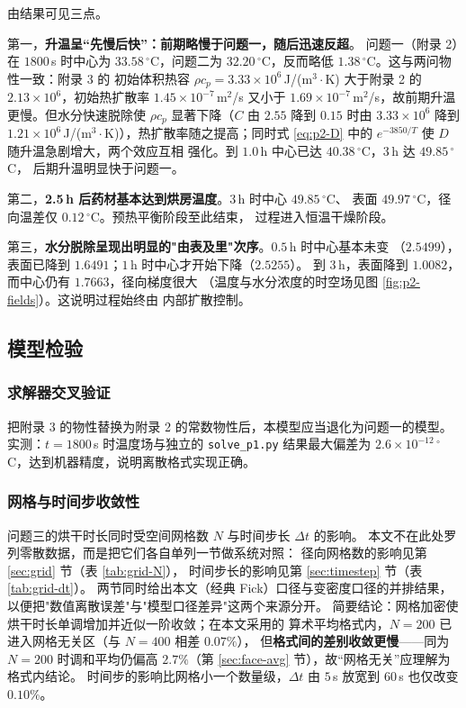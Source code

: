 \documentclass[12pt,a4paper,fontset=none]{ctexart}
\begin{document}
由结果可见三点。

第一，\textbf{升温呈“先慢后快”：前期略慢于问题一，随后迅速反超}。
问题一（附录 2）在 $1800$\,s 时中心为 $33.58\,^\circ$C，问题二为
$32.20\,^\circ$C，反而略低 $1.38\,^\circ$C。这与两问物性一致：附录 3 的
初始体积热容 $\rho c_p=3.33\times10^6$\,J/(m$^3\cdot$K) 大于附录 2 的
$2.13\times10^6$，初始热扩散率 $1.45\times10^{-7}$\,m$^2$/s 又小于
$1.69\times10^{-7}$\,m$^2$/s，故前期升温更慢。但水分快速脱除使
$\rho c_p$ 显著下降（$C$ 由 $2.55$ 降到 $0.15$ 时由 $3.33\times10^6$
降到 $1.21\times10^6$\,J/(m$^3\cdot$K)），热扩散率随之提高；同时式
\eqref{eq:p2-D} 中的 $e^{-3850/T}$ 使 $D$ 随升温急剧增大，两个效应互相
强化。到 $1.0$\,h 中心已达 $40.38\,^\circ$C，$3$\,h 达 $49.85\,^\circ$C，
后期升温明显快于问题一。

第二，\textbf{2.5\,h 后药材基本达到烘房温度}。$3$\,h 时中心 $49.85\,^\circ$C、
表面 $49.97\,^\circ$C，径向温差仅 $0.12\,^\circ$C。预热平衡阶段至此结束，
过程进入恒温干燥阶段。

第三，\textbf{水分脱除呈现出明显的"由表及里"次序}。$0.5$\,h 时中心基本未变
（$2.5499$），表面已降到 $1.6491$；$1$\,h 时中心才开始下降（$2.5255$）。
到 $3$\,h，表面降到 $1.0082$，而中心仍有 $1.7663$，径向梯度很大
（温度与水分浓度的时空场见图 \ref{fig:p2-fields}）。这说明过程始终由
内部扩散控制。

\subsection{模型检验}
\label{sec:p23-verify}

\subsubsection{求解器交叉验证}

把附录 3 的物性替换为附录 2 的常数物性后，本模型应当退化为问题一的模型。
实测：$t=1800$\,s 时温度场与独立的 \texttt{solve\_p1.py} 结果最大偏差为
$2.6\times10^{-12}\,^\circ$C，达到机器精度，说明离散格式实现正确。

\subsubsection{网格与时间步收敛性}

问题三的烘干时长同时受空间网格数 $N$ 与时间步长 $\Delta t$ 的影响。
本文不在此处罗列零散数据，而是把它们各自单列一节做系统对照：
径向网格数的影响见第 \ref{sec:grid} 节（表 \ref{tab:grid-N}），
时间步长的影响见第 \ref{sec:timestep} 节（表 \ref{tab:grid-dt}）。
两节同时给出本文（经典 Fick）口径与变密度口径的并排结果，
以便把"数值离散误差"与"模型口径差异"这两个来源分开。
简要结论：网格加密使烘干时长单调增加并近似一阶收敛；在本文采用的
算术平均格式内，$N=200$ 已进入网格无关区（与 $N=400$ 相差 $0.07\%$），
但\textbf{格式间的差别收敛更慢}——同为 $N=200$ 时调和平均仍偏高
$2.7\%$（第 \ref{sec:face-avg} 节），故“网格无关”应理解为格式内结论。
时间步的影响比网格小一个数量级，$\Delta t$ 由 $5$\,s 放宽到 $60$\,s
也仅改变 $0.10\%$。
\end{document}
